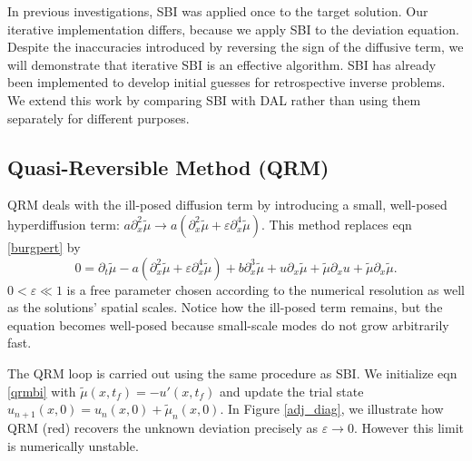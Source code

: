 \documentclass[%
 reprint,
 amsmath,amssymb,
 aps,
 pre,
]{revtex4-2}
\newcommand\tmu{\tilde{\mu}}
\begin{document}
In previous investigations, SBI was applied once to the target solution.
Our iterative implementation differs, because we apply SBI to the deviation equation.
Despite the inaccuracies introduced by reversing the sign of the diffusive term, we will demonstrate that iterative SBI is an effective algorithm.
SBI has already been implemented to develop initial guesses for retrospective inverse problems. 
We extend this work by comparing SBI with DAL rather than using them separately for different purposes.

\subsection{Quasi-Reversible Method (QRM)}\label{secQRM}
QRM deals with the ill-posed diffusion term by introducing a small, well-posed hyperdiffusion term: $a\partial_x^2 \tmu \to a(\partial_x^2 \tmu + \varepsilon \partial_x^4 \tmu)$. 
This method replaces eqn \ref{burgpert} by
\begin{equation}
  0 = \partial_t \tmu - a(\partial_x^2 \tmu + \varepsilon\partial_x^4 \tmu) + b\partial_x^3 \tmu + u\partial_x\tmu + \tmu\partial_x u + \tmu\partial_x\tmu.\label{qrmbi}
\end{equation} 
$0 < \varepsilon \ll 1$ is a free parameter chosen according to the numerical resolution as well as the solutions' spatial scales.
Notice how the ill-posed term remains, but the equation becomes well-posed because small-scale modes do not grow arbitrarily fast.

The QRM loop is carried out using the same procedure as SBI.
We initialize eqn \ref{qrmbi} with $\tmu(x, t_f) = -u'(x,t_f)$ and update the trial state $u_{n+1}(x,0) = u_n(x,0) + \tmu_n(x,0)$.
In Figure \ref{adj_diag}, we illustrate how QRM (red) recovers the unknown deviation precisely as $\varepsilon\to 0$.
However this limit is numerically unstable.
\end{document}
